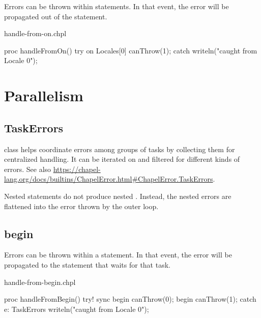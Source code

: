 Errors can be thrown within  statements. In that event, the error
will be propagated out of the  statement.

\begin{chapelexample}{handle-from-on.chpl}
\begin{chapel}
proc handleFromOn() {
  try {
    on Locales[0] {
      canThrow(1);
    }
  } catch {
    writeln("caught from Locale 0");
  }
}
\end{chapel}
\begin{chapelpost}
\end{chapelpost}
\begin{chapeloutput}
\end{chapeloutput}
\end{chapelexample}


\section{Parallelism}
\label{Errors_Parallelism}

\subsection{TaskErrors}
\label{TaskErrors}

 class helps coordinate errors among groups of tasks by collecting
them for centralized handling. It can be iterated on and filtered for
different kinds of errors. See also
\url{https://chapel-lang.org/docs/builtins/ChapelError.html#ChapelError.TaskErrors}.

Nested  statements do not produce nested .
Instead, the nested errors are flattened into the  error
thrown by the outer loop.

\subsection{begin}
\label{Errors_begin}

Errors can be thrown within a  statement. In that event, the error
will be propagated to the  statement that waits for that task.

\begin{chapelexample}{handle-from-begin.chpl}
\begin{chapel}
proc handleFromBegin() {
  try! {
    sync {
      begin canThrow(0);
      begin canThrow(1);
    }
  } catch e: TaskErrors {
    writeln("caught from Locale 0");
  }
}
\end{chapel}
\begin{chapelpost}
\end{chapelpost}
\begin{chapeloutput}
\end{chapeloutput}
\end{chapelexample}


